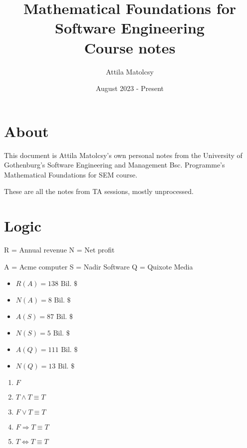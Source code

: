 \documentclass{article}
\title{Mathematical Foundations for Software Engineering \\[1ex] \large Course notes}
\author{Attila Matolcsy}
\date{\nth{25} August 2023 - Present}
\let\stdsection\section
\renewcommand\section{\newpage\stdsection}
\begin{document}
\maketitle

\tableofcontents

\section{About}

This document is Attila Matolcsy's own personal notes from the University of Gothenburg's Software Engineering and Management Bsc. Programme's Mathematical Foundations for SEM course.

These are all the notes from TA sessions, mostly unprocessed.

\section{Logic}

R = Annual revenue
N = Net profit

A = Acme computer
S = Nadir Software
Q = Quixote Media

\begin{itemize}
  \item $R(A) = 138 \text{ Bil. \$}$
  
  \item $N(A) = 8 \text{ Bil. \$}$
  
  \item $A(S) = 87 \text{ Bil. \$}$
  
  \item $N(S) = 5 \text{ Bil. \$}$
  
  \item $A(Q) = 111 \text{ Bil. \$}$
  
  \item $N(Q) = 13 \text{ Bil. \$}$
\end{itemize}

\begin{enumerate}[label=\alph*)]
  \item $F$
  
  \item $T \wedge T \equiv T$
  
  \item $F \vee T \equiv T$
  
  \item $F \Rightarrow T \equiv T$
  
  \item $T \Leftrightarrow T \equiv T$
\end{enumerate}
\end{document}
